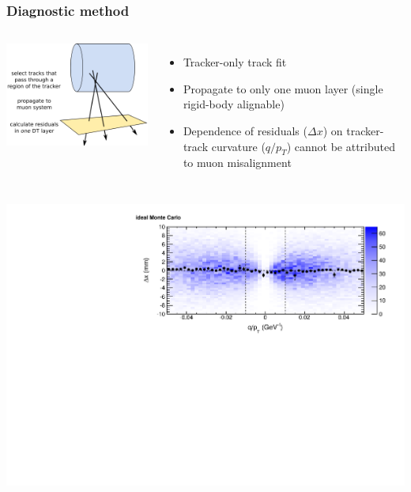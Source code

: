 \documentclass[compress]{beamer}
\begin{document}
\begin{frame}
\frametitle{Diagnostic method}
\begin{columns}
\includegraphics[width=\linewidth]{method.png}

\begin{itemize}
\item Tracker-only track fit
\item Propagate to only one muon layer (single rigid-body alignable)
\item Dependence of residuals ($\Delta x$) on tracker-track curvature
  ($q/p_T$) cannot be attributed to muon misalignment
\end{itemize}
\end{columns}
\begin{center}
\includegraphics[width=0.6\linewidth]{residuals_ideal.pdf}
\vspace{-1 cm}
\end{center}
\end{frame}
\end{document}
